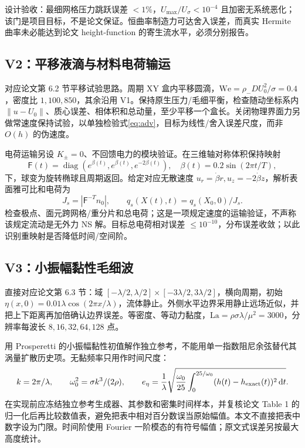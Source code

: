 \documentclass[UTF8,a4paper,11pt,fontset=fandol]{ctexart}
\numberwithin{equation}{section}
\newcommand{\mat}[1]{\mathsf{#1}}\newcommand{\code}[1]{\nolinkurl{#1}}
\begin{document}
设计验收：最细网格压力跳跃误差 $<1\%$，$U_{\max}/U_\sigma<10^{-4}$ 且加密无系统恶化；该门是项目目标，不是论文保证。恒曲率制造力可达舍入误差，而真实 Hermite 曲率未必能达到论文 height-function 的寄生流水平，必须分别报告。

\subsection{V2：平移液滴与材料电荷输运}
对应论文第 6.2 节平移试验思路。周期 XY 盒内平移圆滴，$\mathrm{We}=\rho_-DU_0^2/\sigma=0.4$，密度比 $1,100,850$，其余沿用 V1。保持原生压力/毛细平衡，检查随动坐标系内 $\|u-U_0\|$、质心误差、相体积和总动量，至少平移一个盒长。关闭物理界面力另做常速度保持试验，以单独检验式\eqref{eq:adv}，目标为线性/舍入误差尺度，而非 $O(h)$ 的伪速度。

电荷运输另设 $K_\pm=0$、不回馈电力的模块验证。在三维轴对称体积保持映射
\begin{equation}
 \mat F(t)=\operatorname{diag}(e^{\beta(t)},e^{\beta(t)},e^{-2\beta(t)}),\quad
 \beta(t)=0.2\sin(2\pi t/T),
\end{equation}
下，球变为旋转椭球且周期返回。给定对应无散速度 $u_r=\dot\beta r,u_z=-2\dot\beta z$，解析表面雅可比和电荷为
\begin{equation}
 J_s=|\mat F^{-T}n_0|,\qquad q_s(X(t),t)=q_s(X_0,0)/J_s.
\end{equation}
检查极点、面元跨网格/重分片和总电荷；这是一项规定速度的运输验证，不声称该规定流动是无外力 NS 解。目标总电荷相对误差 $\le10^{-10}$，分布误差收敛；以此识别重映射是否降低时间/空间阶。

\subsection{V3：小振幅黏性毛细波}
直接对应论文第 6.3 节：域 $[-\lambda/2,\lambda/2]\times[-3\lambda/2,3\lambda/2]$，横向周期，初始 $\eta(x,0)=0.01\lambda\cos(2\pi x/\lambda)$，流体静止。外侧水平边界采用静止远场近似，并把上下距离再加倍确认边界误差。等密度、等动力黏度，$\mathrm{La}=\rho\sigma\lambda/\mu^2=3000$，分辨率每波长 $8,16,32,64,128$ 点。

用 Prosperetti 的小振幅黏性初值解作独立参考\cite{prosperetti}，不能用单一指数阻尼余弦替代其涡量扩散历史项。无黏频率只用作时间尺度：
\begin{equation}
 k=2\pi/\lambda,\qquad\omega_0^2=\sigma k^3/(2\rho),\qquad
 e_\eta=\frac1\lambda\sqrt{\frac{\omega_0}{25}\int_0^{25/\omega_0}
 (h(t)-h_{\rm exact}(t))^2\,\mathrm d t}.
\end{equation}
在实现前应冻结独立参考生成器、其参数和密集时间样本，并复核论文 Table 1 的归一化后再比较数值表，避免把表中相对百分数误当原始幅值。本文不直接把表中数字设为门限。时间阶使用 Fourier 一阶模态的有符号幅值；原文式误差另按最大高度统计。
\end{document}
